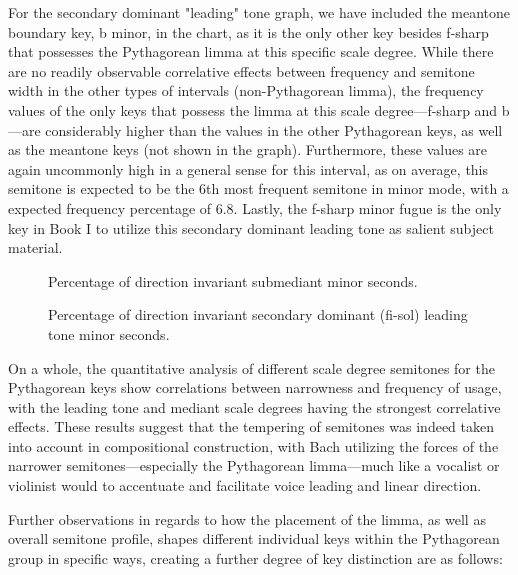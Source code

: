For the secondary dominant "leading" tone graph, we have included the
meantone boundary key, b minor, in the chart, as it is the only other
key besides f-sharp that possesses the Pythagorean limma at this
specific scale degree. While there are no readily observable correlative
effects between frequency and semitone width in the other types of
intervals (non-Pythagorean limma), the frequency values of the only keys
that possess the limma at this scale degree---f-sharp and
b---are considerably higher than the values in the other Pythagorean
keys, as well as the meantone keys (not shown in the graph).
Furthermore, these values are again uncommonly high in a general sense
for this interval, as on average, this semitone is expected to be the
6th most frequent semitone in minor mode, with a expected frequency
percentage of 6.8. Lastly, the f-sharp minor fugue is the only key in
Book I to utilize this secondary dominant leading tone as salient
subject material.




\begin{figure}[H]
\vspace{1.5em}
    \centering
    \caption{Percentage of direction invariant submediant minor seconds. }
\end{figure}


\begin{figure}[H]
\vspace{1.5em}
    \centering
    \caption{Percentage of direction invariant secondary dominant (fi-sol) leading tone minor seconds. }
\end{figure}    On a whole, the quantitative analysis of different scale degree
semitones for the Pythagorean keys show correlations between narrowness
and frequency of usage, with the leading tone and mediant scale degrees
having the strongest correlative effects. These results suggest that the
tempering of semitones was indeed taken into account in compositional
construction, with Bach utilizing the forces of the narrower
semitones---especially the Pythagorean limma---much like a
vocalist or violinist would to accentuate and facilitate voice leading
and linear direction.

Further observations in regards to how the placement of the limma, as
well as overall semitone profile, shapes different individual keys
within the Pythagorean group in specific ways, creating a further degree
of key distinction are as follows:

